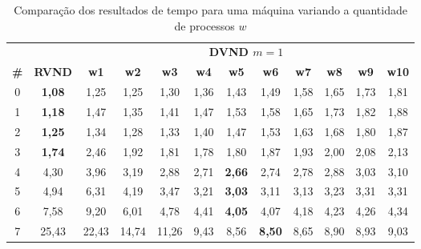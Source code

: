 \begin{table}[htbp]
\caption{Comparação dos resultados de tempo para uma máquina variando a quantidade de processos $w$}
\begin{center}
\begin{tabular}{cccccccccccc}
\hline
\hline
\multicolumn{2}{c}{} &\multicolumn{10}{c}{\textbf{DVND $m=1$}} \\
\cline{3-12}
\textbf{\#} & \textbf{RVND}& \textbf{w1}& \textbf{w2}& \textbf{w3}& \textbf{w4}& \textbf{w5}& \textbf{w6}& \textbf{w7}& \textbf{w8}& \textbf{w9}& \textbf{w10} \\
\hline
0 & \textbf{1,08}& 1,25& 1,25& 1,30&1,36&1,43&1,49&1,58&1,65&1,73&1,81 \\
1 & \textbf{1,18}& 1,47& 1,35& 1,41&1,47&1,53&1,58&1,65&1,73&1,82&1,88 \\
2 & \textbf{1,25}& 1,34& 1,28& 1,33&1,40&1,47&1,53&1,63&1,68&1,80&1,87 \\
3 & \textbf{1,74}& 2,46& 1,92& 1,81&1,78&1,80&1,87&1,93&2,00&2,08&2,13 \\
4 & 4,30& 3,96& 3,19& 2,88&2,71&\textbf{2,66}&2,74&2,78&2,88&3,03&3,10 \\
5 & 4,94& 6,31& 4,19& 3,47&3,21&\textbf{3,03}&3,11&3,13&3,23&3,31&3,31 \\
6 & 7,58& 9,20& 6,01& 4,78&4,41&\textbf{4,05}&4,07&4,18&4,23&4,26&4,34 \\
7 & 25,43&22,43&14,74&11,26&9,43&8,56&\textbf{8,50}&8,65&8,90&8,93&9,03 \\
\hline
\end{tabular}
\label{tab:rvndDvndN1times}
\end{center}
\end{table}

